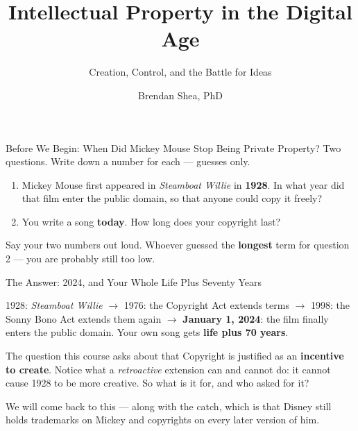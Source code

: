 ﻿\documentclass[aspectratio=169,11pt]{beamer}
\title[Intellectual Property]{Intellectual Property in the Digital Age}
\subtitle{Creation, Control, and the Battle for Ideas}
\author{Brendan Shea, PhD}
\institute{Rochester Community and Technical College\\PHIL 1150: Computing and AI Ethics}
\date{}
\begin{document}




\begin{frame}{Before We Begin: When Did Mickey Mouse Stop Being Private Property?}
Two questions. Write down a number for each --- guesses only.

\begin{enumerate}
    \item Mickey Mouse first appeared in \emph{Steamboat Willie} in \textbf{1928}. In what year did that film enter the public domain, so that anyone could copy it freely?
    \item You write a song \textbf{today}. How long does your copyright last?
\end{enumerate}

\begin{discussionbox}
Say your two numbers out loud. Whoever guessed the \textbf{longest} term for question 2 --- you are probably still too low.
\end{discussionbox}
\end{frame}

\begin{frame}{The Answer: 2024, and Your Whole Life Plus Seventy Years}
\begin{casestudybox}
\small
1928: \emph{Steamboat Willie} $\rightarrow$ 1976: the Copyright Act extends terms $\rightarrow$ 1998: the Sonny Bono Act extends them again $\rightarrow$ \textbf{January 1, 2024}: the film finally enters the public domain. Your own song gets \textbf{life plus 70 years}.
\end{casestudybox}

\begin{alertblock}{The question this course asks about that}
Copyright is justified as an \textbf{incentive to create}. Notice what a \emph{retroactive} extension can and cannot do: it cannot cause 1928 to be more creative. So what is it for, and who asked for it?
\end{alertblock}

We will come back to this --- along with the catch, which is that Disney still holds trademarks on Mickey and copyrights on every later version of him.
\end{frame}
\end{document}
